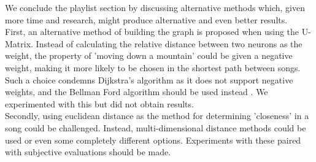 We conclude the playlist section by discussing alternative methods which, given more time and research, might produce 
alternative and even better results. \\
First, an alternative method of building the graph is proposed when using the U-Matrix. Instead of calculating the relative distance between two neurons as the weight, the property of 'moving down a mountain' could be given a negative weight, making it more likely to be chosen in the shortest path between songs. Such a choice condemns Dijkstra's algorithm as it does not support negative weights, and the Bellman Ford algorithm should be used instead \citep{algs4}. We experimented with this but did not obtain results.\\
Secondly, using euclidean distance as the method for determining 'closeness' in a song could be challenged. Instead, multi-dimensional distance methods could be used or even some completely different options. Experiments with these paired with subjective evaluations should be made. \\




